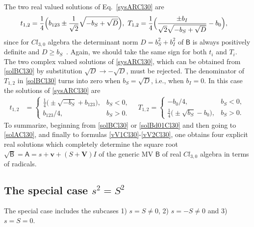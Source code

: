 \documentclass{birkjour}
\newcommand{\cl}[2]{\ensuremath{\mathit{Cl}_{#1,#2}}}
\def\A{\mathsf{A}}
\def\B{\mathsf{B}}
\newcommand{\bv}{\ensuremath{\mathbf{v}}}
\newcommand{\bV}{\ensuremath{\mathbf{V}}}
\begin{document}
The two real valued solutions of Eq.~\eqref{sysARCl30} are
\begin{equation}\label{solBCl30}
\begin{split}
  &t_{1,2}=\frac{1}{4} \Bigl(b_{123} \pm \frac{1}{\sqrt{2}}\sqrt{-b_{S}+\sqrt{D}}\Bigr),\
  T_{1,2}=\frac{1}{4}\Bigl(\frac{\pm b_{I}}{\sqrt{2}\sqrt{-b_{S}+\sqrt{D}}}-
  b_{0}\Bigr),
\end{split}
\end{equation}
since for \cl{3}{0} algebra the determinant norm
$D=b_{S}^2+b_{I}^2$ of $\B$ is always positively definite and
$D\ge b_{S}$~\cite{Acus2018}. Again, we should take the same sign
for both $t_i$ and $T_i$. The two complex valued solutions of
\eqref{sysARCl30}, which can be obtained from \eqref{solBCl30} by
substitution $\sqrt{D}\to -\sqrt{D}$, must be rejected. The
  denominator of $T_{1,2}$ in \eqref{solBCl30} turns into zero when
$b_{S}=\sqrt{D}$, i.e., when $b_{I}=0$. In this case the solutions
of  \eqref{sysARCl30} are
\begin{equation}\label{solBd01Cl30}
\begin{split}
 t_{1,2}&=\begin{cases}
   \frac{1}{4} \bigl(\pm\sqrt{-b_{S}}+b_{123}\bigr),& b_{S}<0,\\
  b_{123}/{4} , &b_{S}>0.
 \end{cases}\quad
  T_{1,2}= \begin{cases}  -b_{0}/{4}, &b_{S}<0,\\
    \frac{1}{4} \bigl(\pm\sqrt{b_{S}}-b_{0}\bigr),& b_{S}>0.
  \end{cases}
\end{split}
\end{equation}
To summarize, beginning from \eqref{solBCl30} or
\eqref{solBd01Cl30} and then going to \eqref{solACl30}, and
finally to formulas \eqref{vV1Cl30}-\eqref{vV2Cl30}, one obtains
four explicit real solutions which completely determine the square
root $\sqrt{\B}=\A=s+\bv+(S+\bV)I$ of the generic MV $\B$ of real
$\cl{3}{0}$ algebra in terms of radicals.

\subsection{The special case $s^2 = S^2$\label{subsec:Cl30spec}}
The special case includes the subcases 1) $s = S\neq 0$, 2) $s =
-S\neq 0$ and 3)~$s=S=0$.
\end{document}
